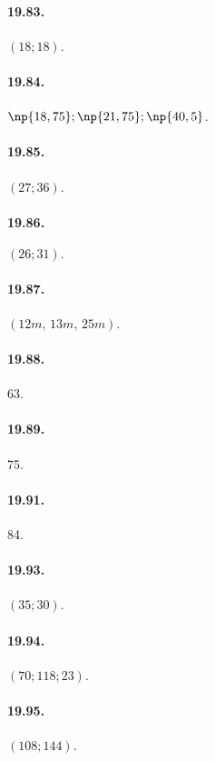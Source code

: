 \begin{multicols}{2}

\paragraph{19.83.} $(18;18)$.

\paragraph{19.84.} $\np{18,75}; \np{21,75}; \np{40,5}$.

\paragraph{19.85.} $(27;36)$.

\paragraph{19.86.} $(26;31).$

\paragraph{19.87.} $(12\unit{m}\text{,~}13\unit{m}\text{,~}25\unit{m})$.

\paragraph{19.88.} 63.

\paragraph{19.89.} 75.

\paragraph{19.91.} 84.

\paragraph{19.93.} $(35;30)$.

\paragraph{19.94.} $(70;118;23)$.

\paragraph{19.95.} $(108;144)$.


\end{multicols}
